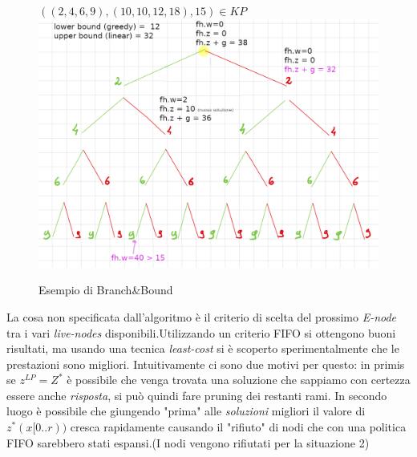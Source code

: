 \documentclass[a4paper]{article}
\begin{document}
\begin{adjustwidth}{.8cm}{0cm}
\begin{itemize}
	\end{itemize}
\newpage
\begin{figure}[!ht]
\centering
\textbf{$((2,4,6,9),(10,10,12,18),15) \in KP$}
\includegraphics[width=1\textwidth]{./img/C14_BB_manuale.png}
\caption{Esempio di Branch\&Bound} \label{FIG:C14_BB_manuale}
\end{figure}
	La cosa non specificata dall'algoritmo è il criterio di scelta del prossimo \textit{E-node} tra i vari \textit{live-nodes} disponibili.Utilizzando un criterio FIFO si ottengono buoni risultati, ma usando una tecnica \emph{least-cost} si è scoperto sperimentalmente che le prestazioni sono migliori.
	Intuitivamente ci sono due motivi per questo: in primis se $z^{LP} = Z^*$ è possibile che venga trovata una soluzione che sappiamo con certezza essere anche \textit{risposta}, si può quindi fare pruning dei restanti rami.
	In secondo luogo è possibile che giungendo "prima" alle \textit{soluzioni} migliori il valore di $z^*(x[0..r))$ cresca rapidamente causando il "rifiuto" di nodi che con una politica FIFO sarebbero stati espansi.(I nodi vengono rifiutati per la situazione 2)
\end{adjustwidth}
\end{document}
